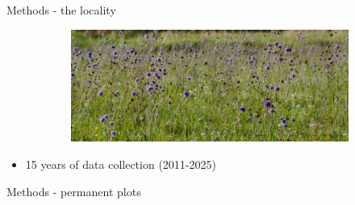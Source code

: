 \documentclass[
  ignorenonframetext,
  aspectratio=169,
]{beamer}
\providecommand{\tightlist}{%
  \setlength{\itemsep}{0pt}\setlength{\parskip}{0pt}}\usepackage{longtable,booktabs,array}
\begin{document}
\begin{frame}{}
\begin{block}{Methods - the locality}
\begin{figure}
\begin{minipage}{0.50\linewidth}
\begin{figure}[H]
{}

\end{figure}%

\end{minipage}%
%
\begin{minipage}{0.50\linewidth}

\begin{figure}[H]


{\centering \includegraphics[width=8.33333in,height=\textheight,keepaspectratio]{images/banner.jpg}

}

\end{figure}%

\end{minipage}%

\end{figure}%

\begin{itemize}
\tightlist
\item
  15 years of data collection (2011-2025)
\end{itemize}
\end{block}

\begin{block}{Methods - permanent plots}
\label{methods---permanent-plots}
\begin{figure}

\begin{minipage}{0.33\linewidth}

\begin{figure}[H]



\end{figure}
\end{minipage}
\end{figure}
\end{block}
\end{frame}
\end{document}
